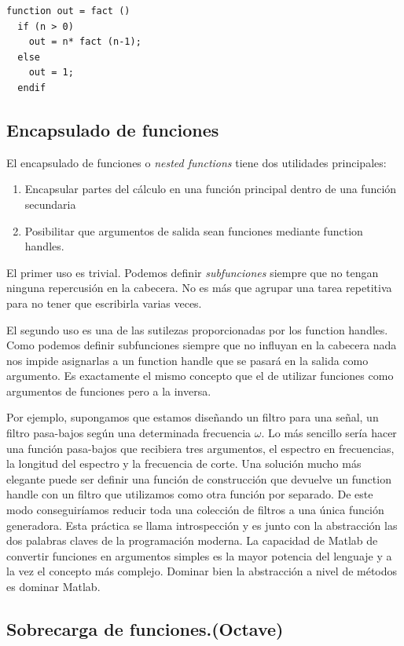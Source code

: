 \begin{verbatim}
function out = fact ()
  if (n > 0)
    out = n* fact (n-1);
  else
    out = 1;
  endif
\end{verbatim}

\subsection{Encapsulado de funciones}

El encapsulado de funciones o \emph{nested functions} tiene dos
utilidades principales:

\begin{enumerate}
\item Encapsular partes del cálculo en una función principal dentro de
  una función secundaria
\item Posibilitar que argumentos de salida sean funciones mediante
  function handles.
\end{enumerate}
El primer uso es trivial. Podemos definir \emph{subfunciones} siempre
que no tengan ninguna repercusión en la cabecera. No es más que
agrupar una tarea repetitiva para no tener que escribirla varias
veces.

El segundo uso es una de las sutilezas proporcionadas por los function
handles. Como podemos definir subfunciones siempre que no influyan en
la cabecera nada nos impide asignarlas a un function handle que se
pasará en la salida como argumento. Es exactamente el mismo concepto
que el de utilizar funciones como argumentos de funciones pero a la
inversa.

Por ejemplo, supongamos que estamos diseñando un filtro para una
señal, un filtro pasa-bajos según una determinada frecuencia $\omega$.
Lo más sencillo sería hacer una función pasa-bajos que recibiera tres
argumentos, el espectro en frecuencias, la longitud del espectro y la
frecuencia de corte. Una solución mucho más elegante puede ser definir
una función de construcción que devuelve un function handle con un
filtro que utilizamos como otra función por separado. De este modo
conseguiríamos reducir toda una colección de filtros a una única
función generadora. Esta práctica se llama introspección y es junto
con la abstracción las dos palabras claves de la programación moderna.
La capacidad de Matlab de convertir funciones en argumentos simples es
la mayor potencia del lenguaje y a la vez el concepto más complejo.
Dominar bien la abstracción a nivel de métodos es dominar Matlab.


\subsection{Sobrecarga de funciones.(Octave)}

